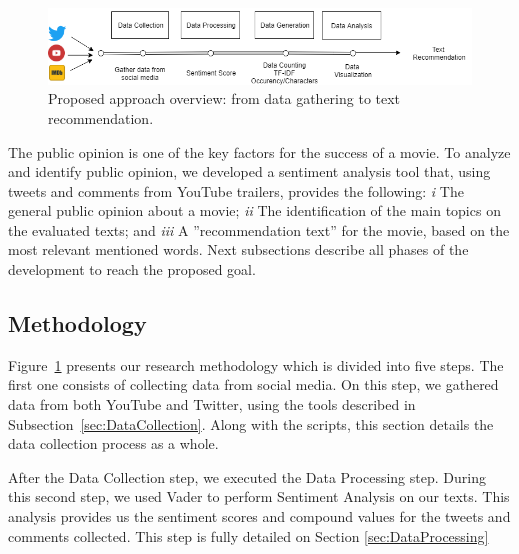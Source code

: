 \begin{figure}[t!]
\begin{center}
\includegraphics[width=0.8\linewidth]{img/Lexicon.png}
\end{center}
   \caption{Proposed approach overview: from data gathering to text recommendation.}
\label{fig:approach}
\end{figure} 

The public opinion is one of the key factors for the success of a movie. To analyze and identify public opinion, we developed a sentiment analysis tool that, using tweets and comments from YouTube trailers, provides the following: \textit{i} The general public opinion about a movie; \textit{ii} The identification of the main topics on the evaluated texts; and \textit{iii} A ''recommendation text'' for the movie, based on the most relevant mentioned words. Next subsections describe all phases of the development to reach the proposed goal.

\subsection{Methodology}
\label{sec:Methodology}

Figure~\ref{fig:approach} presents our research methodology which is divided into five steps. The first one consists of collecting data from social media. On this step, we gathered data from both YouTube and Twitter, using the tools described in Subsection~\ref{sec:DataCollection}. Along with the scripts, this section details the data collection process as a whole.

After the Data Collection step, we executed the Data Processing step. During this second step, we used Vader to perform Sentiment Analysis on our texts.  This analysis provides us the sentiment scores and compound values for the tweets and comments collected. This step is fully detailed on Section \ref{sec:DataProcessing}



